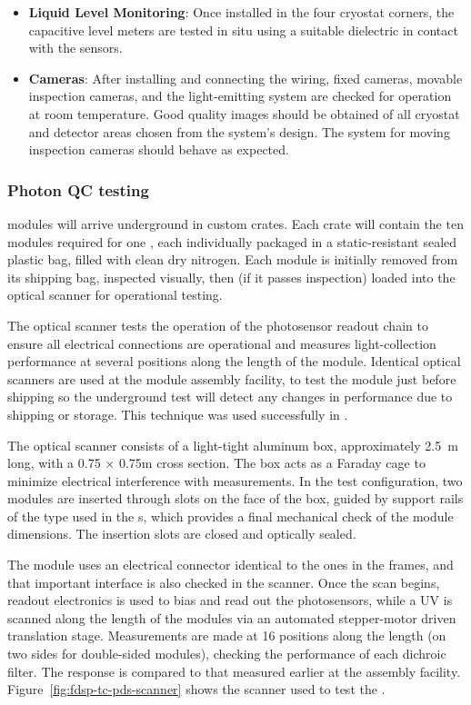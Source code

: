 \begin{itemize}
\item {\bf Liquid Level Monitoring}: Once installed in the four cryostat corners, the capacitive level meters are tested in situ 
using a suitable dielectric in contact with the sensors.

\item {\bf Cameras}: After installing and connecting the wiring, fixed cameras, movable inspection cameras, and the light-emitting system are checked for operation at room temperature. Good quality images should be obtained of all cryostat and detector areas chosen from the system's design. The system for moving inspection cameras should behave as expected.  
\end{itemize}

\subsubsection{Photon QC testing}
 modules will arrive underground in custom crates.  
Each crate will contain the ten modules required for one , each individually packaged in a static-resistant sealed plastic bag, filled with clean dry nitrogen. 
Each  module is initially removed from its shipping bag, inspected visually, then (if it passes inspection) loaded into the optical scanner for operational testing.

The optical scanner tests the operation of the photosensor readout chain to ensure all electrical connections are operational and measures light-collection performance at several positions along the length of the module.
Identical optical scanners are used at the module assembly facility, to test the module just before shipping so the underground test will detect any changes in performance due to shipping or storage.  
This technique was used successfully in .

The optical scanner consists of a light-tight aluminum box, approximately \SI{2.5}{m} long, with a \num{0.75} $\times$ \num{0.75}m cross section. 
The box acts as a Faraday cage to minimize electrical interference with measurements. In the  test configuration, two  modules are inserted through slots on the face of the box, guided by support rails of the type used in the s, which provides a final mechanical check of the  module dimensions.  
The insertion slots are closed and optically sealed.

The  module uses an electrical connector identical to the ones in the  frames, and that important interface is also checked in the scanner.  
Once the scan begins,   readout electronics is used to bias and read out the photosensors, while a UV  is scanned along the length of the modules via an automated stepper-motor driven translation stage.  Measurements are made at 16 positions along the length (on two sides for double-sided  modules), checking the performance of each  dichroic filter. The response is compared to that measured earlier at the assembly facility. Figure~\ref{fig:fdsp-tc-pds-scanner} shows the scanner used to test the  .

